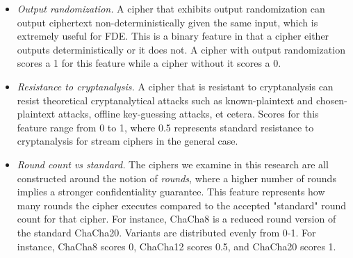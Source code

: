 \begin{itemize}

 \item \emph{Output randomization.} A cipher that exhibits output randomization
 can output ciphertext non-deterministically given the same input, which is
 extremely useful for FDE\@. This is a binary feature in that a cipher either
 outputs deterministically or it does not. A cipher with output randomization
 scores a 1 for this feature while a cipher without it scores a 0. 

 \item \emph{Resistance to cryptanalysis.} A cipher that is resistant to
 cryptanalysis can resist theoretical cryptanalytical attacks such as
 known-plaintext and chosen-plaintext attacks, offline key-guessing attacks, et
 cetera. Scores for this feature range from 0 to 1, where 0.5 represents
 standard resistance to cryptanalysis for stream ciphers in the general case\@.

 \item \emph{Round count vs standard.} The ciphers we examine in this research
 are all constructed around the notion of \emph{rounds}, where a higher number
 of rounds implies a stronger confidentiality guarantee. This feature represents
 how many rounds the cipher executes compared to the accepted "standard" round
 count for that cipher. For instance, ChaCha8 is a reduced round version of the
 standard ChaCha20. Variants are distributed evenly from 0-1. For instance,
 ChaCha8 scores 0, ChaCha12 scores 0.5, and ChaCha20 scores 1\@. 

\end{itemize}


